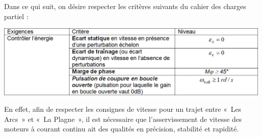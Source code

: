 \documentclass[10pt,fleqn]{article} %
\begin{document}
\vspace{.25cm}
Dans ce qui suit, on désire respecter les critères suivants du cahier des charges partiel :
\begin{center}
	\includegraphics[width=\linewidth]{images2/fig_01}
\end{center}

En effet, afin de respecter les consignes de vitesse pour un trajet entre «~Les Arcs~» et «~La Plagne~», il est nécessaire que l’asservissement de vitesse des moteurs à courant continu ait des qualités en précision, stabilité et rapidité.
\end{document}
